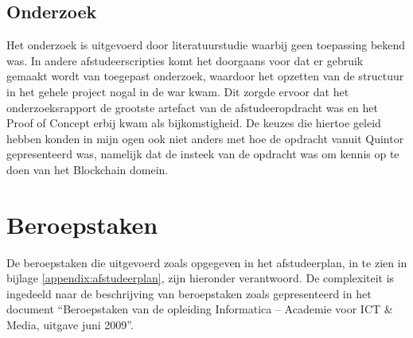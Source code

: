 \subsection{Onderzoek}

Het onderzoek is uitgevoerd door literatuurstudie waarbij geen toepassing bekend was. In andere afstudeerscripties komt het doorgaans voor dat er gebruik gemaakt wordt van toegepast onderzoek, waardoor het opzetten van de structuur in het gehele project nogal in de war kwam. Dit zorgde ervoor dat het onderzoeksrapport de grootste artefact van de afstudeeropdracht was en het Proof of Concept erbij kwam als bijkomstigheid. De keuzes die hiertoe geleid hebben konden in mijn ogen ook niet anders met hoe de opdracht vanuit Quintor gepresenteerd was, namelijk dat de insteek van de opdracht was om kennis op te doen van het Blockchain domein.

\section{Beroepstaken}

De beroepstaken die uitgevoerd zoals opgegeven in het afstudeerplan, in te zien in bijlage \ref{appendix:afstudeerplan}, zijn hieronder verantwoord. De complexiteit is ingedeeld naar de beschrijving van beroepstaken zoals gepresenteerd in het document ``Beroepstaken van de opleiding Informatica -- Academie voor ICT \& Media, uitgave juni 2009''.

